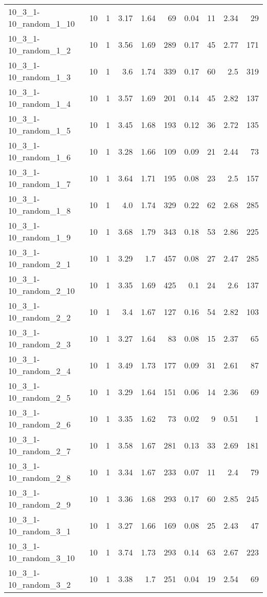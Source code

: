 \begin{center}
\begin{scriptsize}
\begin{longtable}{lrrrrrrrrr}
10\_3\_1-10\_random\_1\_10 & 10 & 1 & 3.17 & 1.64 & 69 & 0.04 & 11 & 2.34 & 29\\
10\_3\_1-10\_random\_1\_2 & 10 & 1 & 3.56 & 1.69 & 289 & 0.17 & 45 & 2.77 & 171\\
10\_3\_1-10\_random\_1\_3 & 10 & 1 & 3.6 & 1.74 & 339 & 0.17 & 60 & 2.5 & 319\\
10\_3\_1-10\_random\_1\_4 & 10 & 1 & 3.57 & 1.69 & 201 & 0.14 & 45 & 2.82 & 137\\
10\_3\_1-10\_random\_1\_5 & 10 & 1 & 3.45 & 1.68 & 193 & 0.12 & 36 & 2.72 & 135\\
10\_3\_1-10\_random\_1\_6 & 10 & 1 & 3.28 & 1.66 & 109 & 0.09 & 21 & 2.44 & 73\\
10\_3\_1-10\_random\_1\_7 & 10 & 1 & 3.64 & 1.71 & 195 & 0.08 & 23 & 2.5 & 157\\
10\_3\_1-10\_random\_1\_8 & 10 & 1 & 4.0 & 1.74 & 329 & 0.22 & 62 & 2.68 & 285\\
10\_3\_1-10\_random\_1\_9 & 10 & 1 & 3.68 & 1.79 & 343 & 0.18 & 53 & 2.86 & 225\\
10\_3\_1-10\_random\_2\_1 & 10 & 1 & 3.29 & 1.7 & 457 & 0.08 & 27 & 2.47 & 285\\
10\_3\_1-10\_random\_2\_10 & 10 & 1 & 3.35 & 1.69 & 425 & 0.1 & 24 & 2.6 & 137\\
10\_3\_1-10\_random\_2\_2 & 10 & 1 & 3.4 & 1.67 & 127 & 0.16 & 54 & 2.82 & 103\\
10\_3\_1-10\_random\_2\_3 & 10 & 1 & 3.27 & 1.64 & 83 & 0.08 & 15 & 2.37 & 65\\
10\_3\_1-10\_random\_2\_4 & 10 & 1 & 3.49 & 1.73 & 177 & 0.09 & 31 & 2.61 & 87\\
10\_3\_1-10\_random\_2\_5 & 10 & 1 & 3.29 & 1.64 & 151 & 0.06 & 14 & 2.36 & 69\\
10\_3\_1-10\_random\_2\_6 & 10 & 1 & 3.35 & 1.62 & 73 & 0.02 & 9 & 0.51 & 1\\
10\_3\_1-10\_random\_2\_7 & 10 & 1 & 3.58 & 1.67 & 281 & 0.13 & 33 & 2.69 & 181\\
10\_3\_1-10\_random\_2\_8 & 10 & 1 & 3.34 & 1.67 & 233 & 0.07 & 11 & 2.4 & 79\\
10\_3\_1-10\_random\_2\_9 & 10 & 1 & 3.36 & 1.68 & 293 & 0.17 & 60 & 2.85 & 245\\
10\_3\_1-10\_random\_3\_1 & 10 & 1 & 3.27 & 1.66 & 169 & 0.08 & 25 & 2.43 & 47\\
10\_3\_1-10\_random\_3\_10 & 10 & 1 & 3.74 & 1.73 & 293 & 0.14 & 63 & 2.67 & 223\\
10\_3\_1-10\_random\_3\_2 & 10 & 1 & 3.38 & 1.7 & 251 & 0.04 & 19 & 2.54 & 69\\

\end{longtable}
\end{scriptsize}
\end{center}
